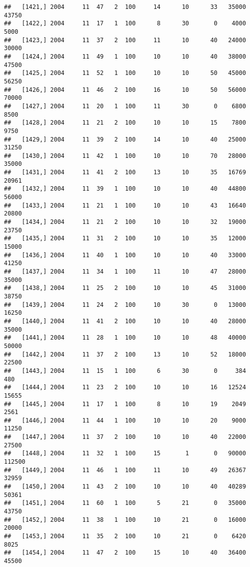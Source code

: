 \documentclass{article}\usepackage[]{graphicx}\usepackage[]{color}
\makeatletter
\newenvironment{kframe}{%
 \def\at@end@of@kframe{}%
 \ifinner\ifhmode%
  \def\at@end@of@kframe{\end{minipage}}%
  \begin{minipage}{\columnwidth}%
 \fi\fi%
 \def\FrameCommand##1{\hskip\@totalleftmargin \hskip-\fboxsep
 \colorbox{shadecolor}{##1}\hskip-\fboxsep
     \hskip-\linewidth \hskip-\@totalleftmargin \hskip\columnwidth}%
 \MakeFramed {\advance\hsize-\width
   \@totalleftmargin\z@ \linewidth\hsize
   \@setminipage}}%
 {\par\unskip\endMakeFramed%
 \at@end@of@kframe}
\newenvironment{knitrout}{}{} %
\makeatother
\begin{document}
\begin{knitrout}
\begin{kframe}
\begin{verbatim}
##   [1421,] 2004     11  47   2  100     14      10      33   35000   43750
##   [1422,] 2004     11  17   1  100      8      30       0    4000    5000
##   [1423,] 2004     11  37   2  100     11      10      40   24000   30000
##   [1424,] 2004     11  49   1  100     10      10      40   38000   47500
##   [1425,] 2004     11  52   1  100     10      10      50   45000   56250
##   [1426,] 2004     11  46   2  100     16      10      50   56000   70000
##   [1427,] 2004     11  20   1  100     11      30       0    6800    8500
##   [1428,] 2004     11  21   2  100     10      10      15    7800    9750
##   [1429,] 2004     11  39   2  100     14      10      40   25000   31250
##   [1430,] 2004     11  42   1  100     10      10      70   28000   35000
##   [1431,] 2004     11  41   2  100     13      10      35   16769   20961
##   [1432,] 2004     11  39   1  100     10      10      40   44800   56000
##   [1433,] 2004     11  21   1  100     10      10      43   16640   20800
##   [1434,] 2004     11  21   2  100     10      10      32   19000   23750
##   [1435,] 2004     11  31   2  100     10      10      35   12000   15000
##   [1436,] 2004     11  40   1  100     10      10      40   33000   41250
##   [1437,] 2004     11  34   1  100     11      10      47   28000   35000
##   [1438,] 2004     11  25   2  100     10      10      45   31000   38750
##   [1439,] 2004     11  24   2  100     10      30       0   13000   16250
##   [1440,] 2004     11  41   2  100     10      10      40   28000   35000
##   [1441,] 2004     11  28   1  100     10      10      48   40000   50000
##   [1442,] 2004     11  37   2  100     13      10      52   18000   22500
##   [1443,] 2004     11  15   1  100      6      30       0     384     480
##   [1444,] 2004     11  23   2  100     10      10      16   12524   15655
##   [1445,] 2004     11  17   1  100      8      10      19    2049    2561
##   [1446,] 2004     11  44   1  100     10      10      20    9000   11250
##   [1447,] 2004     11  37   2  100     10      10      40   22000   27500
##   [1448,] 2004     11  32   1  100     15       1       0   90000  112500
##   [1449,] 2004     11  46   1  100     11      10      49   26367   32959
##   [1450,] 2004     11  43   2  100     10      10      40   40289   50361
##   [1451,] 2004     11  60   1  100      5      21       0   35000   43750
##   [1452,] 2004     11  38   1  100     10      21       0   16000   20000
##   [1453,] 2004     11  35   2  100     10      21       0    6420    8025
##   [1454,] 2004     11  47   2  100     15      10      40   36400   45500

\end{verbatim}
\end{kframe}
\end{knitrout}
\end{document}
